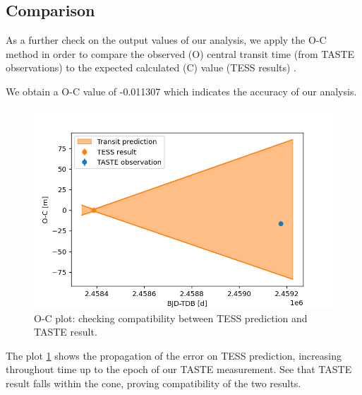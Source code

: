 \documentclass[a4paper,11pt,twocolumn]{article}
\begin{document}
\clearpage
\subsection{Comparison}

As a further check on the output values of our analysis, we apply 
the O-C method in order to compare the observed (O)
central transit time (from TASTE observations) to the expected calculated (C) value (TESS results) .

We obtain a O-C value of -0.011307 which indicates the accuracy of our analysis.

\begin{figure}[H]
  \centering
    \includegraphics[scale=0.3, angle=0]{../pictures/comparison/oc.png}
    \caption{O-C plot: checking compatibility between TESS prediction and TASTE result.}
    \label{fig:ocplot}
\end{figure}
The plot \ref{fig:ocplot} shows the propagation of the error on TESS prediction,
increasing throughout time up to the epoch of our TASTE measurement. See 
that TASTE result falls within the cone, proving compatibility of the 
two results.

\newpage
\end{document}
